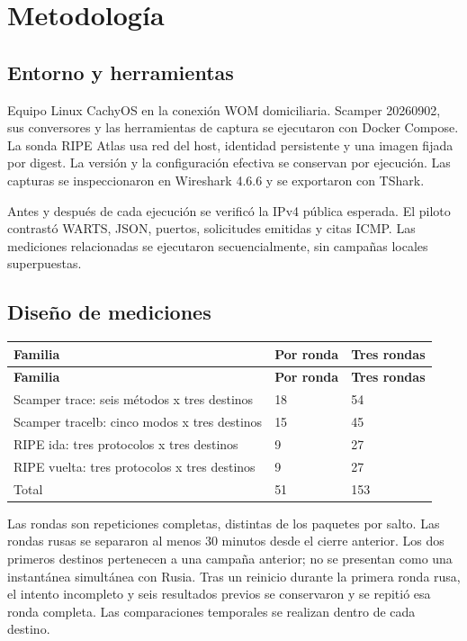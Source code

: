\section{Metodología}\label{sec:metodo}
\subsection{Entorno y herramientas}
Equipo Linux CachyOS en la conexión WOM domiciliaria. Scamper 20260902, sus conversores y las herramientas de captura se ejecutaron con Docker Compose. La sonda RIPE Atlas usa red del host, identidad persistente y una imagen fijada por digest. La versión y la configuración efectiva se conservan por ejecución. Las capturas se inspeccionaron en Wireshark 4.6.6 y se exportaron con TShark.

Antes y después de cada ejecución se verificó la IPv4 pública esperada. El piloto contrastó WARTS, JSON, puertos, solicitudes emitidas y citas ICMP. Las mediciones relacionadas se ejecutaron secuencialmente, sin campañas locales superpuestas.

\subsection{Diseño de mediciones}
\begingroup
\fontsize{9}{11}\selectfont
\addtocounter{table}{-1}
\begin{longtable}{p{10cm}p{2cm}p{2cm}}
\toprule
\textbf{Familia} & \textbf{Por ronda} & \textbf{Tres rondas} \\ \midrule
\endfirsthead
\toprule
\textbf{Familia} & \textbf{Por ronda} & \textbf{Tres rondas} \\ \midrule
\endhead
Scamper trace: seis métodos x tres destinos & 18 & 54 \\
Scamper tracelb: cinco modos x tres destinos & 15 & 45 \\
RIPE ida: tres protocolos x tres destinos & 9 & 27 \\
RIPE vuelta: tres protocolos x tres destinos & 9 & 27 \\
Total & 51 & 153 \\
\bottomrule
\end{longtable}
\endgroup
Las rondas son repeticiones completas, distintas de los paquetes por salto. Las rondas rusas se separaron al menos 30 minutos desde el cierre anterior. Los dos primeros destinos pertenecen a una campaña anterior; no se presentan como una instantánea simultánea con Rusia. Tras un reinicio durante la primera ronda rusa, el intento incompleto y seis resultados previos se conservaron y se repitió esa ronda completa. Las comparaciones temporales se realizan dentro de cada destino.

